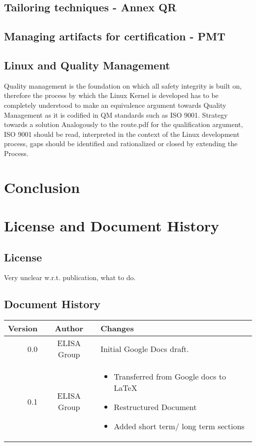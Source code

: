 \documentclass[12pt]{../Common_files/ElisaPaper}
\begin{document}
\subsection{Tailoring techniques - Annex QR}


\subsection{Managing artifacts for certification - PMT}



\subsection{Linux and Quality Management}
Quality management is the foundation on which all safety integrity is built on, therefore the process by which the Linux Kernel is developed has to be completely understood to make an equivalence argument towards Quality Management as it is codified in QM standards such as ISO 9001.
Strategy towards a solution
Analogously to the route.pdf for the qualification argument, ISO 9001 should be read, interpreted in the context of the Linux development process, gaps should be identified and rationalized or closed by extending the Process.

\section{Conclusion}

\section{License and Document History}
\subsection{License}
Very unclear w.r.t. publication, what to do.

\subsection{Document History}

\begin{tabular}{r|c|p{}} 
Version & Author & Changes \\
\hline
0.0 & ELISA Group & Initial Google Docs draft. \\
0.1 & ELISA Group & \begin{itemize}
	\item Transferred from Google docs to  \LaTeX
	\item Restructured Document 
	\item Added short term/ long term sections 
\end{itemize}	
\end{tabular} 	


{}

	
	
	
\end{document}
